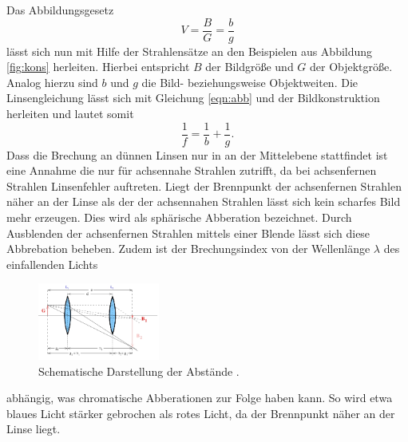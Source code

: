 Das Abbildungsgesetz
\begin{equation}
  V = \frac{B}{G} = \frac{b}{g}
  \label{eqn:abb}
\end{equation}
lässt sich nun mit Hilfe der Strahlensätze an den Beispielen aus Abbildung \ref{fig:kons}
herleiten. Hierbei entspricht $B$ der Bildgröße und $G$ der Objektgröße. Analog
hierzu sind $b$ und $g$ die Bild- beziehungsweise Objektweiten. Die Linsengleichung
lässt sich mit Gleichung \eqref{eqn:abb} und der Bildkonstruktion herleiten und
lautet somit
\begin{equation}
  \frac{1}{f}=\frac{1}{b}+\frac{1}{g}.
\end{equation}
Dass die Brechung an dünnen Linsen nur in an der Mittelebene stattfindet ist eine
Annahme die nur für achsennahe Strahlen zutrifft, da bei achsenfernen Strahlen
Linsenfehler auftreten. Liegt der Brennpunkt der achsenfernen Strahlen näher an
der Linse als der der achsennahen Strahlen lässt sich kein scharfes Bild mehr erzeugen.
Dies wird als sphärische Abberation bezeichnet. Durch Ausblenden der
achsenfernen Strahlen mittels einer Blende lässt sich diese Abbrebation beheben.
Zudem ist der Brechungsindex von der Wellenlänge $\lambda$ des einfallenden Lichts
\begin{figure}
  \includegraphics[width=4cm]{bilder/abstande.jpg}
  \caption{Schematische Darstellung der Abstände \cite{408}.}
  \label{fig:abs}
\end{figure}
abhängig, was chromatische Abberationen zur Folge haben kann.
So wird etwa blaues Licht stärker gebrochen als rotes Licht, da der Brennpunkt
näher an der Linse liegt.

